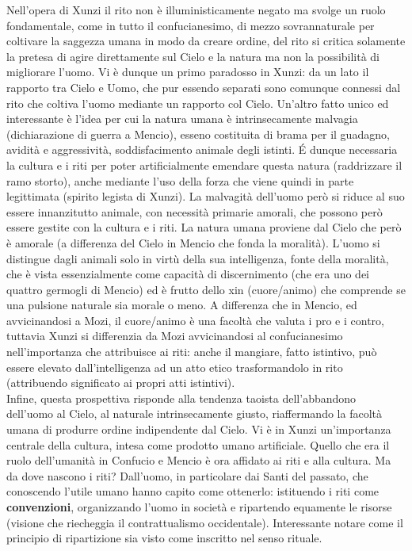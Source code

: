 \documentclass[10pt,a4paper]{report}
\begin{document}
Nell'opera di Xunzi il rito non è illuministicamente negato ma svolge un ruolo fondamentale, come in tutto il confucianesimo, di mezzo sovrannaturale per coltivare la saggezza umana in modo da creare ordine, del rito si critica solamente la pretesa di agire direttamente sul Cielo e la natura ma non la possibilità di migliorare l'uomo. Vi è dunque un primo paradosso in Xunzi: da un lato il rapporto tra Cielo e Uomo, che pur essendo separati sono comunque connessi dal rito che coltiva l'uomo mediante un rapporto col Cielo. Un'altro fatto unico ed interessante è l'idea per cui la natura umana è intrinsecamente malvagia (dichiarazione di guerra a Mencio), esseno costituita di brama per il guadagno, avidità e aggressività, soddisfacimento animale degli istinti. \'E dunque necessaria la cultura e i riti per poter artificialmente emendare questa natura (raddrizzare il ramo storto), anche mediante l'uso della forza che viene quindi in parte legittimata (spirito legista di Xunzi). La malvagità dell'uomo però si riduce al suo essere innanzitutto animale, con necessità primarie amorali, che possono però essere gestite con la cultura e i riti. La natura umana proviene dal Cielo che però è amorale (a differenza del Cielo in Mencio che fonda la moralità). L'uomo si distingue dagli animali solo in virtù della sua intelligenza, fonte della moralità, che è vista essenzialmente come capacità di discernimento (che era uno dei quattro germogli di Mencio) ed è frutto dello xin (cuore/animo) che comprende se una pulsione naturale sia morale o meno. A differenza che in Mencio, ed avvicinandosi a Mozi, il cuore/animo è una facoltà che valuta i pro e i contro, tuttavia Xunzi si differenzia da Mozi avvicinandosi al confucianesimo nell'importanza che attribuisce ai riti: anche il mangiare, fatto istintivo, può essere elevato dall'intelligenza ad un atto etico trasformandolo in rito (attribuendo significato ai propri atti istintivi).\\
Infine, questa prospettiva risponde alla tendenza taoista dell'abbandono dell'uomo al Cielo, al naturale intrinsecamente giusto, riaffermando la facoltà umana di produrre ordine indipendente dal Cielo. Vi è in Xunzi un'importanza centrale della cultura, intesa come prodotto umano artificiale. Quello che era il ruolo dell'umanità in Confucio e Mencio è ora affidato ai riti e alla cultura. Ma da dove nascono i riti? Dall'uomo, in particolare dai Santi del passato, che conoscendo l'utile umano hanno capito come ottenerlo: istituendo i riti come \textbf{convenzioni}, organizzando l'uomo in società e ripartendo equamente le risorse (visione che riecheggia il contrattualismo occidentale). Interessante notare come il principio di ripartizione sia visto come inscritto nel senso rituale.   
\end{document}

